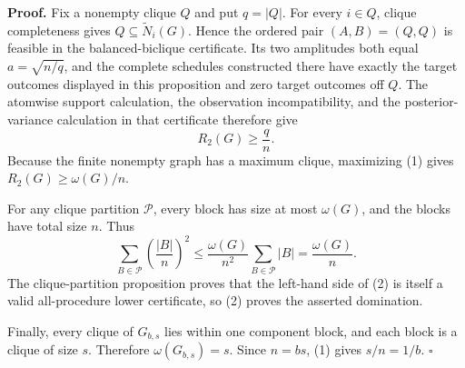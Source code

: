 \textbf{Proof.}
Fix a nonempty clique \(Q\) and put \(q=|Q|\).  For every \(i\in Q\), clique completeness gives \(Q\subseteq\widetilde N_i(G)\).  Hence the ordered pair \((A,B)=(Q,Q)\) is feasible in the balanced-biclique certificate.  Its two amplitudes both equal \(a=\sqrt{n/q}\), and the complete schedules constructed there have exactly the target outcomes displayed in this proposition and zero target outcomes off \(Q\).  The atomwise support calculation, the observation incompatibility, and the posterior-variance calculation in that certificate therefore give
\[
R_2(G)\geq\frac{q}{n}.
\tag{1}
\]
Because the finite nonempty graph has a maximum clique, maximizing (1) gives \(R_2(G)\geq\omega(G)/n\).

For any clique partition \(\mathcal P\), every block has size at most \(\omega(G)\), and the blocks have total size \(n\).  Thus
\[
\sum_{B\in\mathcal P}\left(\frac{|B|}{n}\right)^2
\leq\frac{\omega(G)}{n^2}\sum_{B\in\mathcal P}|B|
=\frac{\omega(G)}n.
\tag{2}
\]
The clique-partition proposition proves that the left-hand side of (2) is itself a valid all-procedure lower certificate, so (2) proves the asserted domination.

Finally, every clique of \(G_{b,s}\) lies within one component block, and each block is a clique of size \(s\).  Therefore \(\omega(G_{b,s})=s\).  Since \(n=bs\), (1) gives \(s/n=1/b\). \(\square\)